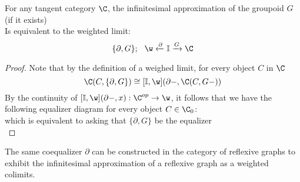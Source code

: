 \begin{proposition}
	For any tangent category $\C$, the infinitesimal approximation of the groupoid $G$ (if it exists)
	\[\]
	Is equivalent to the weighted limit:
	\[
		\{\partial, G\};\hspace{0.25cm} 	\w \xleftarrow[]{\partial} \mathbb{I} \xrightarrow[]{G} \C
	\]
\end{proposition}
\begin{proof}
	Note that by the definition of a weighed limit, for every object $C$ in $\C$
	\[
		\C(C, \{\partial, G\}) \cong [\mathbb{I}, \w](\partial -, \C(C, G-))
	\]
	By the continuity of $ [\mathbb{I}, \w](\partial -, x):\C^{op} \to \w$, it follows that we have the following equalizer diagram for every object $C \in \C_0$:
	\[\]
	which is equivalent to asking that $\{\partial, G\}$ be the equalizer
	\[\]
\end{proof}
\begin{remark}
	The same coequalizer $\partial$ can be constructed in the category of reflexive graphs to exhibit the infinitesimal approximation of a reflexive graph as a weighted colimits.
\end{remark}



